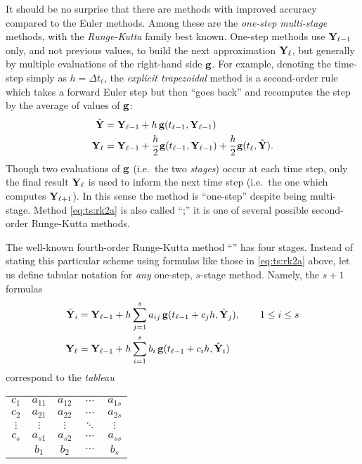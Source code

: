 It should be no surprise that there are methods with improved accuracy compared to the Euler methods.  Among these are the \emph{one-step multi-stage} methods, with the \emph{Runge-Kutta} family best known.  One-step methods use $\mathbf{Y}_{\ell-1}$ only, and not previous values, to build the next approximation $\mathbf{Y}_\ell$, but generally by multiple evaluations of the right-hand side $\mathbf{g}$.  For example, denoting the time-step simply as $h=\Delta t_\ell$, the \emph{explicit trapezoidal} method \citep{AscherPetzold1998} is a second-order rule which takes a forward Euler step but then ``goes back'' and recomputes the step by the average of values of $\mathbf{g}$:
\begin{align}
\hat{\mathbf{Y}} &= \mathbf{Y}_{\ell-1} + h\, \mathbf{g}(t_{\ell-1},\mathbf{Y}_{\ell-1}) \label{eq:ts:rk2a} \\
\mathbf{Y}_\ell &= \mathbf{Y}_{\ell-1} + \frac{h}{2} \mathbf{g}(t_{\ell-1},\mathbf{Y}_{\ell-1}) + \frac{h}{2} \mathbf{g}(t_\ell,\hat{\mathbf{Y}}). \notag
\end{align}
Though two evaluations of $\mathbf{g}$ (i.e.~the two \emph{stages}) occur at each time step, only the final result $\mathbf{Y}_\ell$ is used to inform the next time step (i.e.~the one which computes $\mathbf{Y}_{\ell+1}$).  In this sense the method is ``one-step'' despite being multi-stage.  Method \eqref{eq:ts:rk2a} is also called ``\RKtwoa;'' it is one of several possible second-order Runge-Kutta methods.

The well-known fourth-order Runge-Kutta method ``\RKfour'' has four stages.  Instead of stating this particular scheme using formulas like those in \eqref{eq:ts:rk2a} above, let us define tabular notation for \emph{any} one-step, $s$-stage method.  Namely, the $s+1$ formulas
\begin{align}
\hat{\mathbf{Y}}_i &= \mathbf{Y}_{\ell-1} + h \sum_{j=1}^s a_{ij}\, \mathbf{g}(t_{\ell-1} + c_j h, \hat{\mathbf{Y}}_j), \qquad 1 \le i \le s \label{eq:ts:rkgeneral} \\
\mathbf{Y}_\ell  &= \mathbf{Y}_{\ell-1} + h \sum_{i=1}^s b_i\, \mathbf{g}(t_{\ell-1} + c_i h, \hat{\mathbf{Y}}_i) \notag
\end{align}
correspond to the \emph{tableau} \citep{Butcher1987}
\begin{center}
\begin{tabular}{c|cccc}
$c_1$    & $a_{11}$ & $a_{12}$ & $\cdots$ & $a_{1s}$ \\
$c_2$    & $a_{21}$ & $a_{22}$ & $\cdots$ & $a_{2s}$ \\
$\vdots$ & $\vdots$ & $\vdots$ & $\ddots$ & $\vdots$ \\
$c_s$    & $a_{s1}$ & $a_{s2}$ & $\cdots$ & $a_{ss}$ \\ \hline
         & $b_1$    & $b_2$    & $\cdots$ & $b_s$
\end{tabular}
\end{center}

